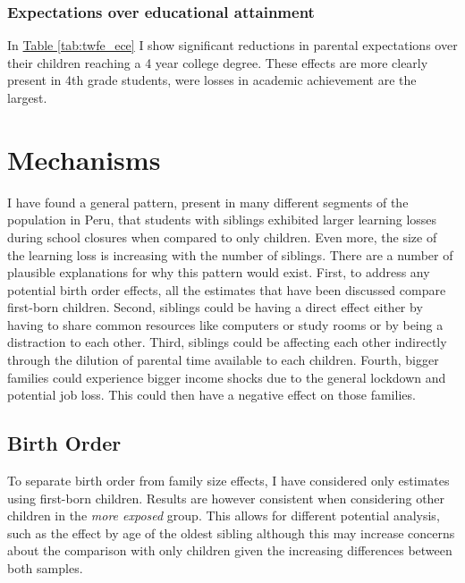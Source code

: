 


\subsubsection{Expectations over educational attainment}

In \hyperref[tab:twfe_ece]{Table \ref{tab:twfe_ece}}
I show significant reductions in parental expectations over their children reaching a 4 year college degree. These effects are more clearly present in 4th grade students, were losses in academic achievement are the largest.

\section{Mechanisms}\label{sec:mechanisms}

I have found a general pattern, present in many different segments of the population in Peru, that students with siblings exhibited larger learning losses during school closures when compared to only children. Even more, the size of the learning loss is increasing with the number of siblings. There are a number of plausible explanations for why this pattern would exist. First, to address any potential birth order effects, all the estimates that have been discussed compare first-born children. Second, siblings could be having a direct effect either by having to share common resources like computers or study rooms or by being a distraction to each other. Third, siblings could be affecting each other indirectly through the dilution of parental time available to each children. Fourth, bigger families could experience bigger income shocks due to the general lockdown and potential job loss. This could then have a negative effect on those families.


\subsection{Birth Order}

To separate birth order from family size effects, I have considered only estimates using first-born children. Results are however consistent when considering other children in the \textit{more exposed} group. This allows for different potential analysis, such as the effect by age of the oldest sibling although this may increase concerns about the comparison with only children given the increasing differences between both samples.

